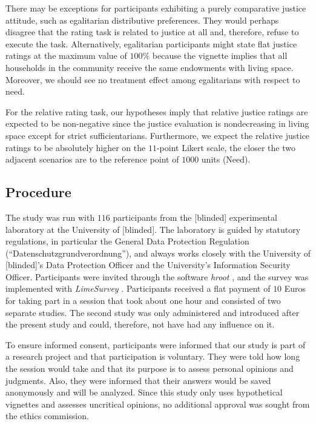 \documentclass[12pt]{scrartcl}
\begin{document}
There may be exceptions for participants exhibiting a purely comparative justice attitude, such as egalitarian distributive preferences.
They would perhaps disagree that the rating task is related to justice at all and, therefore, refuse to execute the task.
Alternatively, egalitarian participants might state flat justice ratings at the maximum value of $100\%$ because the vignette implies that all households in the community receive the same endowments with living space.
Moreover, we should see no treatment effect among egalitarians with respect to need.

For the relative rating task, our hypotheses imply that relative justice ratings are expected to be non-negative since the justice evaluation is nondecreasing in living space except for strict sufficientarians.
Furthermore, we expect the relative justice ratings to be absolutely higher on the $11$-point Likert scale, the closer the two adjacent scenarios are to the reference point of $1000$ units (Need).


\subsection{Procedure}\label{sec:procedure}
The study was run with $116$ participants from the [blinded] experimental laboratory at the University of [blinded].
The laboratory is guided by statutory regulations, in particular the General Data Protection Regulation (``Datenschutzgrundverordnung''), and always works closely with the University of [blinded]'s Data Protection Officer and the University's Information Security Officer.
Participants were invited through the software \textit{hroot} \citep{bock_hroot_2014}, and the survey was implemented with \textit{LimeSurvey} \citep{limesurvey_project_team_limesurvey_2020}.
Participants received a flat payment of $10$ Euros for taking part in a session that took about one hour and consisted of two separate studies.
The second study was only administered and introduced after the present study and could, therefore, not have had any influence on it.

To ensure informed consent, participants were informed that our study is part of a research project and that participation is voluntary.
They were told how long the session would take and that its purpose is to assess personal opinions and judgments.
Also, they were informed that their answers would be saved anonymously and will be analyzed.
Since this study only uses hypothetical vignettes and assesses uncritical opinions, no additional approval was sought from the ethics commission.
\end{document}
